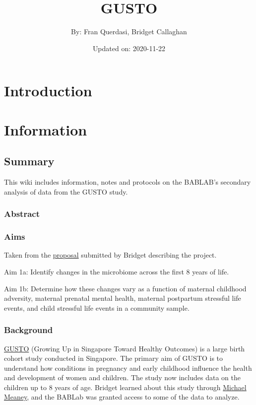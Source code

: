 \documentclass[
]{book}
\title{GUSTO}
\author{By: Fran Querdasi, Bridget Callaghan}
\date{Updated on: 2020-11-22}
\begin{document}
\maketitle

{
\setcounter{tocdepth}{1}
\tableofcontents
}
\hypertarget{introduction}{%
\chapter{Introduction}\label{introduction}}

\hypertarget{information}{%
\chapter{Information}\label{information}}

\hypertarget{summary}{%
\section{Summary}\label{summary}}

This wiki includes information, notes and protocols on the BABLAB's secondary analysis of data from the GUSTO study.

\hypertarget{abstract}{%
\subsection{Abstract}\label{abstract}}

\hypertarget{aims}{%
\subsection{Aims}\label{aims}}

Taken from the \href{https://ucla.app.box.com/file/740587024475}{proposal} submitted by Bridget describing the project.

Aim 1a: Identify changes in the microbiome across the first 8 years of life.

Aim 1b: Determine how these changes vary as a function of maternal childhood adversity, maternal prenatal mental health, maternal postpartum stressful life events, and child stressful life events in a community sample.

\hypertarget{background}{%
\subsection{Background}\label{background}}

\href{http://www.gusto.sg/}{GUSTO} (Growing Up in Singapore Toward Healthy Outcomes) is a large birth cohort study conducted in Singapore. The primary aim of GUSTO is to understand how conditions in pregnancy and early childhood influence the health and development of women and children. The study now includes data on the children up to 8 years of age. Bridget learned about this study through \href{https://douglas.research.mcgill.ca/michael-meaney}{Michael Meaney}, and the BABLab was granted access to some of the data to analyze.
\end{document}
